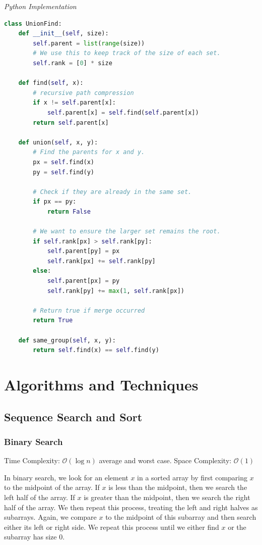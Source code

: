 \documentclass{article}
\newcommand{\bigO}{\mathcal{O}}
\begin{document}
\vspace{8pt} \emph{Python Implementation}
\begin{lstlisting}[language=Python]
class UnionFind:
    def __init__(self, size):
        self.parent = list(range(size))
        # We use this to keep track of the size of each set.
        self.rank = [0] * size
        
    def find(self, x):
        # recursive path compression
        if x != self.parent[x]:
            self.parent[x] = self.find(self.parent[x])
        return self.parent[x]
        
    def union(self, x, y):
        # Find the parents for x and y.
        px = self.find(x)
        py = self.find(y)
        
        # Check if they are already in the same set.
        if px == py:
            return False
        
        # We want to ensure the larger set remains the root.
        if self.rank[px] > self.rank[py]:
            self.parent[py] = px
            self.rank[px] += self.rank[py]
        else: 
            self.parent[px] = py
            self.rank[py] += max(1, self.rank[px])
        
        # Return true if merge occurred
        return True
        
    def same_group(self, x, y):
        return self.find(x) == self.find(y)
\end{lstlisting}

\newpage    
\section{Algorithms and Techniques}
    \subsection{Sequence Search and Sort}
    \subsubsection{Binary Search}
    Time Complexity: $\bigO(\log n)$ average and worst case.  Space Complexity: $\bigO(1)$
    
    In binary search, we look for an element $x$ in a sorted array by first comparing $x$ to the midpoint of the array. If $x$ is less than the midpoint, then we search the left half of the array. If $x$ is greater than the midpoint, then we search the right half of the array. We then repeat this process, treating the left and right halves as subarrays. Again, we compare $x$ to the midpoint of this subarray and then search either its left or right side. We repeat this process until we either find $x$ or the subarray has size 0.
    
\end{document}
